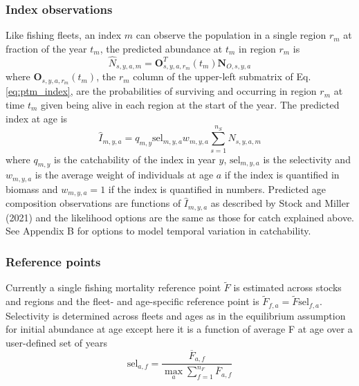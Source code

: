 \documentclass[
]{article}
\begin{document}
\hypertarget{index-observations}{%
\subsubsection*{Index observations}\label{index-observations}}

Like fishing fleets, an index \(m\) can observe the population in a single region \(r_m\) at fraction of the year \(t_m\), the predicted abundance at \(t_m\) in region \(r_m\) is
\[\widehat{N}_{s,y,a,m} = \mathbf{O}_{s,y,a,r_m}^T(t_m) \mathbf{N}_{O,s,y,a}\]
where \(\mathbf{O}_{s,y,a,r_m}(t_m)\), the \(r_m\) column of the upper-left submatrix of Eq. \ref{eq:ptm_index}, are the probabilities of surviving and occurring in region \(r_m\) at time \(t_m\) given being alive in each region at the start of the year. The predicted index at age is
\[\widehat{I}_{m,y,a} = q_{m,y} \text{sel}_{m,y,a}w_{m,y,a}\sum^{n_S}_{s = 1}\widehat{N}_{s,y,a,m}\]
where \(q_{m,y}\) is the catchability of the index in year \(y\), \(\text{sel}_{m,y,a}\) is the selectivity and \(w_{m,y,a}\) is the average weight of individuals at age \(a\) if the index is quantified in biomass and \(w_{m,y,a} = 1\) if the index is quantified in numbers. Predicted age composition observations are functions of \(\widehat{I}_{m,y,a}\) as described by Stock and Miller (2021) and the likelihood options are the same as those for catch explained above. See Appendix B for options to model temporal variation in catchability.

\hypertarget{reference-points}{%
\subsubsection*{Reference points}\label{reference-points}}

Currently a single fishing mortality reference point \(\widetilde F\) is estimated across stocks and regions and the fleet- and age-specific reference point is \(\widetilde F_{f,a} = \widetilde F \text{sel}_{f,a}\). Selectivity is determined across fleets and ages as in the equilibrium assumption for initial abundance at age except here it is a function of average F at age over a user-defined set of years
\begin{equation}\label{eq:spr_sel}
  \text{sel}_{a,f} = \frac{\overline F_{a,f}}{\max_a \sum^{n_F}_{f=1}{\overline F}_{a,f}}
\end{equation}
\end{document}
